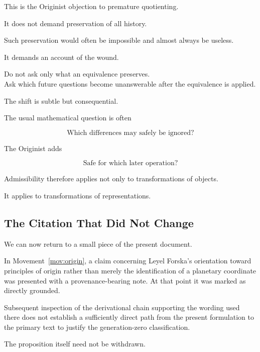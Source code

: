\documentclass[
  11pt,
  a4paper,
  DIV=12,
  BCOR=0mm,
  parskip=half-
]{scrartcl}
\theoremstyle{definition}
\theoremstyle{plain}
\theoremstyle{remark}
\begin{document}
This is the Originist objection to premature quotienting.

It does not demand preservation of all history.

Such preservation would often be impossible and almost always be useless.

It demands an account of the wound.

\begin{held}
\centering
Do not ask only what an equivalence preserves.\\[3pt]
Ask which future questions become unanswerable after the equivalence is
applied.
\end{held}

The shift is subtle but consequential.

The usual mathematical question is often

\[
  \text{Which differences may safely be ignored?}
\]

The Originist adds

\[
  \text{Safe for which later operation?}
\]

Admissibility therefore applies not only to transformations of objects.

It applies to transformations of representations.


\subsection{The Citation That Did Not Change}
\label{sec:citation-wound}

We can now return to a small piece of the present document.

In Movement~\ref{mov:origin}, a claim concerning Leyel Forska's orientation
toward principles of origin rather than merely the identification of a
planetary coordinate was presented with a provenance-bearing note. At that
point it was marked as directly grounded.

Subsequent inspection of the derivational chain supporting the wording used
there does not establish a sufficiently direct path from the present
formulation to the primary text to justify the generation-zero classification.

The proposition itself need not be withdrawn.
\end{document}
